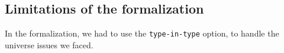 \documentclass[preprint,9pt,numbers]{sigplanconf}
\DeclareMathOperator{\Type}{Type}
\begin{document}
\subsection{Limitations of the formalization}
\label{sec:limit-form}

In the formalization, we had to use the \texttt{type-in-type} option, to handle
the universe issues we faced.


\end{document}
